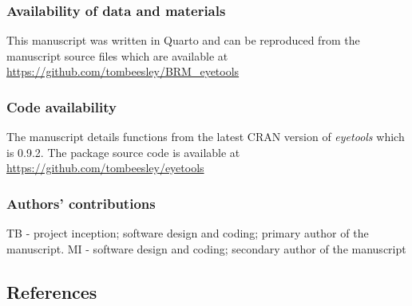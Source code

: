 \documentclass[
  man,
  floatsintext,
  longtable,
  nolmodern,
  notxfonts,
  notimes,
  colorlinks=true,linkcolor=blue,citecolor=blue,urlcolor=blue]{apa7}
\begin{document}
\subsubsection{Availability of data and
materials}\label{availability-of-data-and-materials}

This manuscript was written in Quarto and can be reproduced from the
manuscript source files which are available at
\url{https://github.com/tombeesley/BRM_eyetools}

\subsubsection{Code availability}\label{code-availability}

The manuscript details functions from the latest CRAN version of
\emph{eyetools} which is 0.9.2. The package source code is available at
\url{https://github.com/tombeesley/eyetools}

\subsubsection{Authors' contributions}\label{authors-contributions}

TB - project inception; software design and coding; primary author of
the manuscript. MI - software design and coding; secondary author of the
manuscript

\subsection{References}\label{references}
\end{document}
